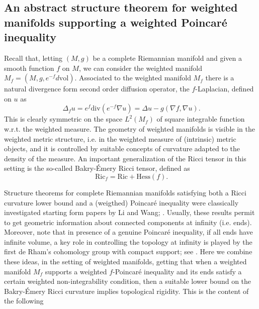 \documentclass[11pt, leqno]{amsart}
\begin{document}
\subsection {An abstract structure theorem for weighted manifolds supporting a weighted Poincar\'e inequality} Recall that, letting $(M, g)$ be a complete Riemannian manifold and given a smooth function $f$ on $M$, we can consider the weighted manifold $M_{f}=(M, g, e^{-f}d\mathrm{vol})$. Associated to the weighted manifold $M_f$ there is a natural divergence form second order diffusion operator, the $f$-Laplacian, defined on $u$ as
\[
\ \Delta_f u=e^{f}\mathrm{div}(e^{-f}\nabla u)=\Delta u- g(\nabla f, \nabla u).
\]
This is clearly symmetric on the space $L^{2}(M_f)$ of square integrable function w.r.t. the weighted measure. The geometry of weighted manifolds is visible in the weighted metric structure, i.e. in the weighted measure of (intrinsic) metric objects, and it is controlled by suitable concepts of curvature adapted to the density of the measure. An important generalization of the Ricci tensor in this setting is the so-called Bakry-\'Emery Ricci tensor, defined as
\[
\ \mathrm{Ric}_{f}=\mathrm{Ric}+\mathrm{Hess}(f).
\]
\medskip

Structure theorems for complete Riemannian manifolds satisfying both a Ricci curvature lower bound and a (weigthed) Poincar\'e inequality were classically investigated starting form papers by Li and Wang; \cite{LiWang_1} \cite{LiWang_Poincare}. Usually, these results permit to get geometric information about connected components at infinity (i.e. ends). Moreover, note that in presence of a genuine Poincar\'e inequality, if all ends have infinite volume, a key role in controlling the topology at infinity is played by the first de Rham's cohomology group with compact support; see \cite[Proposition 2.4]{Carron_LectNotes}. Here we combine these ideas, in the setting of weighted manifolds, getting that when a weighted manifold $M_f$ supports a weighted $f$-Poincar\'e inequality and its ends satisfy a certain weighted non-integrability condition, then a suitable lower bound on the Bakry-\'Emery Ricci curvature implies topological rigidity. This is the content of the following
\end{document}
